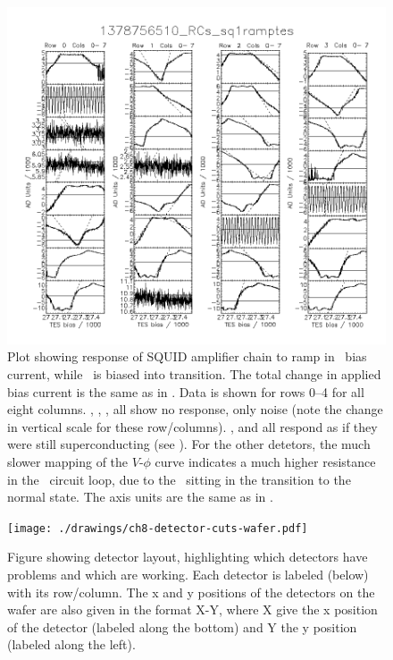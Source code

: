\begin{figure}[th]
\centering
\includegraphics[width=\textwidth]{./images/1378756510_RCs_sq1ramptes_00.png}
\caption{Plot showing response of SQUID amplifier chain to ramp in \TES\ bias current, while \TES\ is biased into transition.
  The total change in applied bias current is the same as in .
  Data is shown for rows 0--4 for all eight columns.
  , , ,  all show no response, only noise (note the change in vertical scale for these row/columns).
  ,  and  all respond as if they were still superconducting (see ).
  For the other detetors, the much slower mapping of the $V$-$\phi$ curve indicates a much higher resistance in the \TES\ circuit loop, due to the \TES\ sitting in the transition to the normal state.
  The axis units are the same as in .
}
\label{fig:tes-bias-ramp-trans}
\end{figure}

\begin{figure}
\centering
\texttt{[image: ./drawings/ch8-detector-cuts-wafer.pdf]}
\caption{
Figure showing detector layout, highlighting which detectors have problems and which are working.
Each detector is labeled (below) with its row/column.
The x and y positions of the detectors on the wafer are also given in the format X-Y, where X give the x position of the detector (labeled along the bottom) and Y the y position (labeled along the left).
}
\label{fig:detector-cuts-wafer}
\end{figure}

